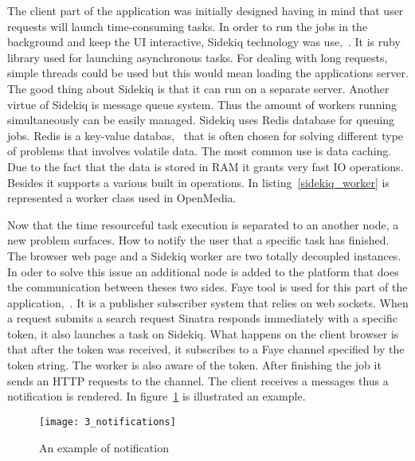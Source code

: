 The client part of the application was initially designed having in mind that user requests will launch time-consuming tasks. In order to run the jobs in the background and keep the UI interactive, Sidekiq technology was \mbox{use, \cite{sidekiq}}. It is ruby library used for launching asynchronous tasks. For dealing with long requests, simple threads could be used but this would mean loading the applications server. The good thing about Sidekiq is that it can run on a separate server. Another virtue of Sidekiq is message queue system. Thus the amount of workers running simultaneously can be easily managed. Sidekiq uses Redis database for queuing jobs. Redis is a key-value \mbox{databas, \cite{redis}} that is often chosen for solving different type of problems that involves volatile data. The most common use is data caching. Due to the fact that the data is stored in RAM it grants very fast IO operations. Besides it supports a various built in operations. In \mbox{listing \ref{sidekiq_worker}} is represented a worker class used in OpenMedia.



Now that the time resourceful task execution is separated to an another node, a new problem surfaces. How to notify the user that a specific task has finished. The browser web page and a Sidekiq worker are two totally decoupled instances. In oder to solve this issue an additional node is added to the platform that does the communication between theses two sides. Faye tool is used for this part of the \mbox{application, \cite{faye}}. It is a publisher subscriber system that relies on web sockets. When a request submits a search request Sinatra responds immediately with a specific token, it also launches a task on Sidekiq. What happens on the client browser is that after the token was received, it subscribes to a Faye channel specified by the token string. The worker is also aware of the token. After finishing the job it sends an HTTP requests to the channel. The client receives a messages thus a notification is rendered. In \mbox{figure \ref{notifications}} is illustrated an example.

\begin{figure}[!ht]
\centering
\texttt{[image: 3\_notifications]}
\caption{An example of notification}\label{notifications}
\end{figure}


\clearpage